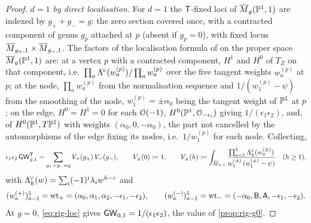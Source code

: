 \begin{proof}
\emph{$d=1$ by direct localisation.} For $d=1$ the $\mathsf{T}$-fixed loci of $\overline{M}_g(\mathbb{P}^1,1)$ are indexed by $g_++g_-=g$: the zero section covered once, with a contracted component of genus $g_p$ attached at $p$ (absent if $g_p=0$), with fixed locus $\overline{M}_{g_+,1}\times\overline{M}_{g_-,1}$. The factors of the localisation formula of \cite{GP99} on the proper space $\overline{M}_g(\mathbb{P}^1,1)$ are: at a vertex $p$ with a contracted component, $H^1$ and $H^0$ of $T_Z$ on that component, i.e.\ $\prod_a\Lambda^{\!\vee}(w^{(p)}_a)/\prod_aw^{(p)}_a$ over the five tangent weights $w^{(p)}_a$ at $p$; at the node, $\prod_aw^{(p)}_a$ from the normalisation sequence and $1/(w^{(p)}_1-\psi)$ from the smoothing of the node, $w^{(p)}_1=\pm\alpha_0$ being the tangent weight of $\mathbb{P}^1$ at $p$; on the edge, $H^0=H^1=0$ for each $\mathcal{O}(-1)$, $H^0(\mathbb{P}^1,\mathcal{O}_{-\epsilon_i})$ giving $1/(\epsilon_1\epsilon_2)$, and, of $H^0(\mathbb{P}^1,T\mathbb{P}^1)$ with weights $(\alpha_0,0,-\alpha_0)$, the part not cancelled by the automorphisms of the edge fixing its nodes, i.e.\ $1/w^{(p)}_1$ for each node. Collecting,
\begin{equation}
\label{eq:rig-loc}
\epsilon_1\epsilon_2\,\mathsf{GW}^{\mathsf{T}}_{g,1}=\sum_{g_++g_-=g}V_+(g_+)\,V_-(g_-),\qquad V_\pm(0)\coloneqq 1,\qquad
V_\pm(h)\coloneqq\int_{\overline{M}_{h,1}}\frac{\prod_{a=1}^{5}\Lambda^{\!\vee}_h(w^{(\pm)}_a)}{w^{(\pm)}_1\,(w^{(\pm)}_1-\psi)}\quad(h\geq 1),
\end{equation}
with $\Lambda^{\!\vee}_h(w)=\sum_i(-1)^i\lambda_iw^{h-i}$ and
\[
(w^{(+)}_a)_{a=1}^5=\mathrm{wt}_+=(\alpha_0,\alpha_1,\alpha_2,-\epsilon_1,-\epsilon_2),\qquad (w^{(-)}_a)_{a=1}^5=\mathrm{wt}_-=(-\alpha_0,\mathsf{B},\mathsf{A},-\epsilon_1,-\epsilon_2).
\]
At $g=0$, \eqref{eq:rig-loc} gives $\mathsf{GW}_{0,1}=1/(\epsilon_1\epsilon_2)$, the value of \cref{prop:rig-g0}. 


\end{proof}
